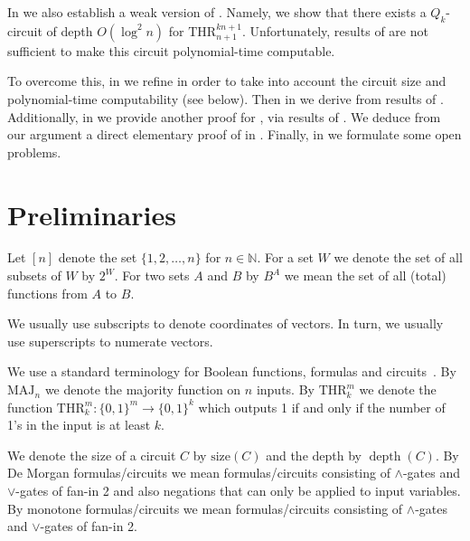 \documentclass{toc}
\def\MAJ{\mathrm{MAJ}}
\def\THR{\mathrm{THR}}
\DeclareMathOperator{\depth}{depth}  %
\begin{document}
In  we also establish a weak version of . Namely, we show that there exists 
%
a $Q_k$-circuit of depth $O(\log^2n)$  %
for $\THR^{kn+1}_{n+1}$. Unfortunately, results of  are not sufficient to make this circuit polynomial-time computable.

To overcome this, in  we refine   in order to take into account the circuit size and polynomial-time computability (see   below). Then in  we derive  from results of . Additionally, in  we provide another proof for , via results of .
We deduce from our argument a direct elementary proof of  in . Finally, in  we formulate some open problems.















\section{Preliminaries} \label{sec:prelim}
Let $[n]$ denote the set $\{1, 2, \ldots, n\}$ for $n\in\mathbb{N}$. For a set $W$ we denote the set of all subsets of $W$ by $2^W$. For two sets $A$ and $B$ by $B^A$ we mean the set of all (total) functions from $A$ to $B$.

We usually use subscripts to denote coordinates of vectors. In turn, we usually use superscripts to numerate vectors.

 We use a standard terminology for Boolean functions, formulas and circuits~\cite{Jukna}. By $\MAJ_n$ we denote the majority function on $n$ inputs. By $\THR^m_k$ we denote the function $\THR^m_k\colon\{0,1\}^m\to\{0,1\}^k$ which outputs 1 if and only if the number of 1's in the input is at least $k$.

We denote the size of a circuit $C$ by $\mathrm{size}(C)$ and the depth by $\depth(C)$. By De Morgan formulas/circuits we mean formulas/circuits consisting of $\land$-gates and $\lor$-gates of fan-in 2 and also negations that can only be applied to input variables. By monotone formulas/circuits we mean formulas/circuits consisting of $\land$-gates and $\lor$-gates of fan-in 2.
\end{document}
